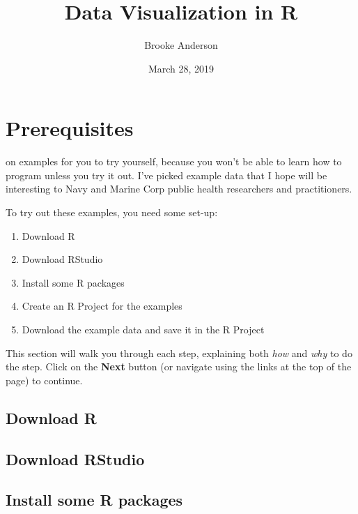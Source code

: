 \documentclass[]{tufte-book}
\title{Data Visualization in R}
\author{Brooke Anderson}
\date{March 28, 2019}
\providecommand{\tightlist}{%
  \setlength{\itemsep}{0pt}\setlength{\parskip}{0pt}}
\begin{document}
\maketitle



{
\setcounter{tocdepth}{1}
\tableofcontents
}

\hypertarget{prerequisites}{%
\chapter{Prerequisites}\label{prerequisites}}

 on examples for you to try yourself,
because you
won't be able to learn how to program unless you try it out. I've picked
example data that I hope will be interesting to Navy and Marine Corp public
health researchers and practitioners.

To try out these examples, you need some set-up:

\begin{enumerate}
\def\labelenumi{\arabic{enumi}.}
\tightlist
\item
  Download R
\item
  Download RStudio
\item
  Install some R packages
\item
  Create an R Project for the examples
\item
  Download the example data and save it in the R Project
\end{enumerate}

This section will walk you through each step, explaining both \emph{how} and
\emph{why} to do the step. Click on the \textbf{Next} button (or navigate using the
links at the top of the page) to continue.

\hypertarget{download-r}{%
\section{Download R}\label{download-r}}

\hypertarget{download-rstudio}{%
\section{Download RStudio}\label{download-rstudio}}

\hypertarget{install-some-r-packages}{%
\section{Install some R packages}\label{install-some-r-packages}}
\end{document}
